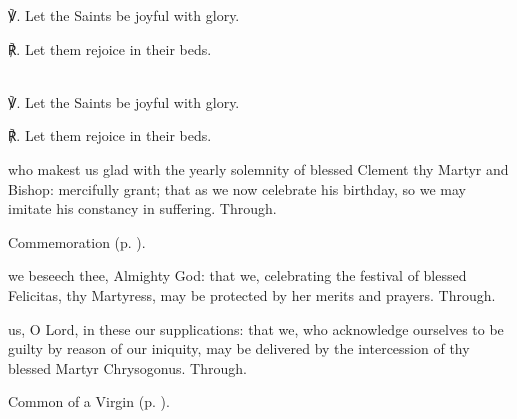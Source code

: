 ℣. Let the Saints be joyful with glory.

℟. Let them rejoice in their beds.



\secondEvensong
{}\\

℣. Let the Saints be joyful with glory.

℟. Let them rejoice in their beds.


\collect
{} who makest us glad with the yearly solemnity of blessed Clement thy Martyr and Bishop: mercifully grant; that as we now celebrate his birthday, so we may imitate his constancy in suffering. Through.

\begin{rubric}
    Commemoration  (p. \pageref{FelicityCollect}).
\end{rubric}


\clearpage
{}

\memorialCollect\label{FelicityCollect}
 we beseech thee, Almighty God: that we, celebrating the festival of blessed Felicitas, thy Martyress, may be protected by her merits and prayers. Through.



\memorialCollect
{} us, O Lord, in these our supplications: that we, who acknowledge ourselves to be guilty by reason of our iniquity, may be delivered by the intercession of thy blessed Martyr Chrysogonus. Through.



\begin{rubric}
	Common of a Virgin (p. \pageref{CommonVirgin}).
\end{rubric}

